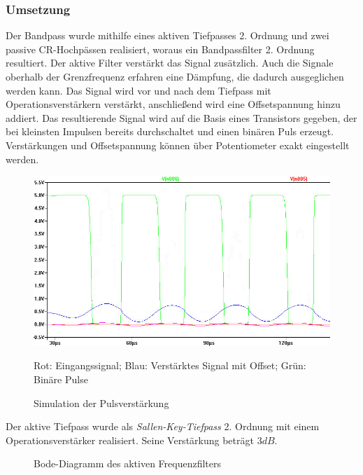 \subsubsection{Umsetzung}
Der Bandpass wurde mithilfe eines aktiven Tiefpasses 2. Ordnung und zwei passive CR-Hochpässen realisiert, woraus ein Bandpassfilter 2. Ordnung resultiert. Der aktive Filter verstärkt das Signal zusätzlich. Auch die Signale oberhalb der Grenzfrequenz erfahren eine Dämpfung, die dadurch ausgeglichen werden kann. Das Signal wird vor und nach dem Tiefpass mit Operationsverstärkern verstärkt, anschließend wird eine Offsetspannung hinzu addiert. Das resultierende Signal wird auf die Basis eines Transistors gegeben, der bei kleinsten Impulsen bereits durchschaltet und einen binären Puls erzeugt. Verstärkungen und Offsetspannung können über Potentiometer exakt eingestellt werden.
\begin{figure}[H]
\centering
\includegraphics[width=(\textwidth), angle=0]{sim/verstaerker_offset.jpg}
\caption{Simulation der Pulsverstärkung} \label{img:Sim1}
Rot: Eingangssignal; Blau: Verstärktes Signal mit Offset; Grün: Binäre Pulse
\end{figure}
Der aktive Tiefpass wurde als \textit{Sallen-Key-Tiefpass} 2. Ordnung mit einem Operationsverstärker realisiert. Seine Verstärkung beträgt $3dB$. 
\begin{figure}[H]
\centering
\caption{Bode-Diagramm des aktiven Frequenzfilters} \label{img:bode}
\end{figure}


